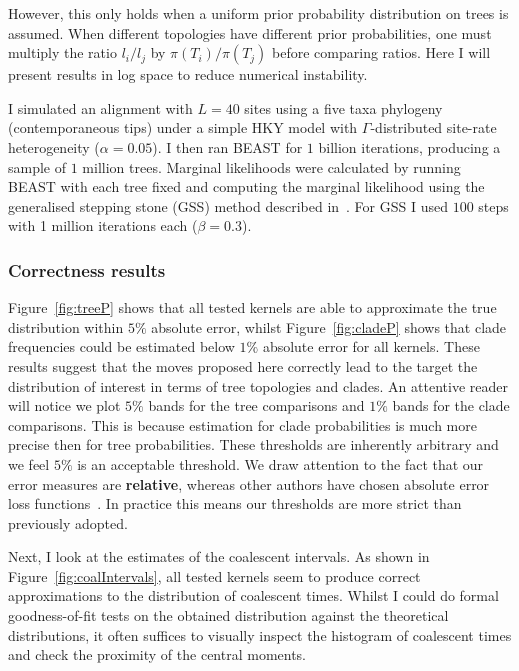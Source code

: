 However, this only holds when a uniform prior probability distribution on trees is assumed. 
When different topologies have different prior probabilities, one must multiply the ratio $l_i/l_j$ by $\pi(T_i)/\pi(T_j)$ before comparing ratios.
Here I will present results in log space to reduce numerical instability.

I simulated an alignment with $L = 40$ sites using a five taxa phylogeny (contemporaneous tips) under a simple HKY model with $\Gamma$-distributed site-rate heterogeneity ($\alpha = 0.05$).
I then ran BEAST for $1$ billion iterations, producing a sample of $1$ million trees.
Marginal likelihoods were calculated by running BEAST with each tree fixed and computing the marginal likelihood using the generalised stepping stone (GSS) method described in~\cite{Baele2015}.
For GSS I used $100$ steps with 1 million iterations each ($\beta = 0.3$).

\subsubsection{Correctness results}
\label{sec:correctness}

Figure~\ref{fig:treeP} shows that all tested kernels are able to approximate the true distribution within $5\%$ absolute error, whilst Figure~\ref{fig:cladeP} shows that clade frequencies could be estimated below $1\%$ absolute error for all kernels.
These results suggest that the moves proposed here correctly lead to the target the distribution of interest in terms of tree topologies and clades.
An attentive reader will notice we plot $5\%$ bands for the tree comparisons and $1\%$ bands for the clade comparisons. 
This is because estimation for clade probabilities is much more precise then for tree probabilities.
These thresholds are inherently arbitrary and we feel $5\%$ is an acceptable threshold.
We draw attention to the fact that our error measures are \textbf{relative}, whereas other authors have chosen absolute error loss functions~\citep{Hoehna2008, Lakner2008}.
In practice this means our thresholds are more strict than previously adopted.

Next, I look at the estimates of the coalescent intervals.
As shown in Figure~\ref{fig:coalIntervals}, all tested kernels seem to produce correct approximations to the distribution of coalescent times.
Whilst I could do formal goodness-of-fit tests on the obtained distribution against the theoretical distributions, it often suffices to visually inspect the histogram of coalescent times and check the proximity of the central moments.%

